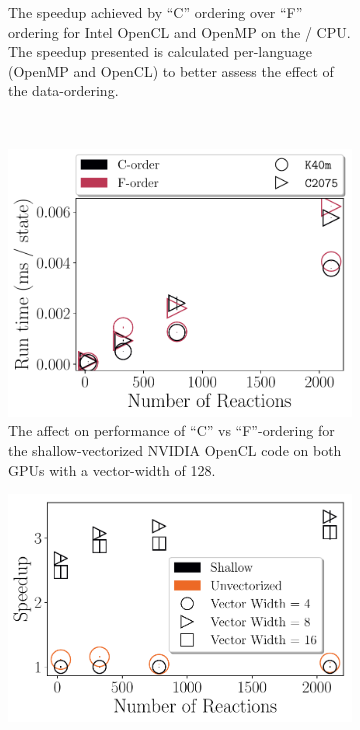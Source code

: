 \documentclass[12pt,number,sort&compress,preprint]{elsarticle}
\begin{document}
\begin{figure}[htbp]
\begin{subfigure}[t]{0.48\linewidth}
      \caption{The speedup achieved by ``C'' ordering over ``F'' ordering for Intel OpenCL and OpenMP on the \avx/ CPU.  The speedup presented is calculated per-language (OpenMP and OpenCL) to better assess the effect of the data-ordering.}
      \label{F:source_cvsf}
  \end{subfigure}
  \\
  \begin{subfigure}[t]{0.48\linewidth}
      \includegraphics[width=\textwidth]{source_gpu_cvsf.pdf}
      \caption{The affect on performance of ``C'' vs ``F''-ordering for the shallow-vectorized NVIDIA OpenCL code on both GPUs with a vector-width of \num{128}.}
      \label{F:source_gpu_cvsf}
  \end{subfigure}
  \hfill
  \begin{subfigure}[t]{0.48\linewidth}
      \includegraphics[width=\textwidth]{source_vector_width.pdf}

\end{subfigure}
\end{figure}
\end{document}
